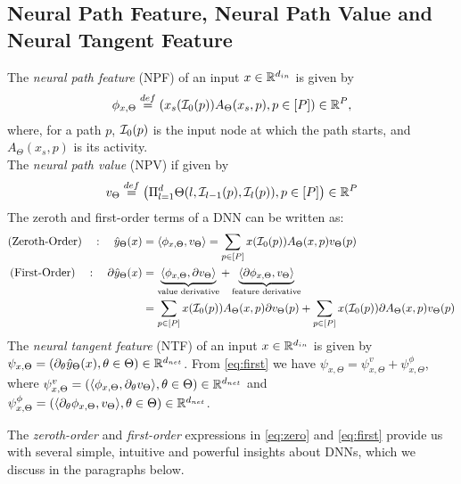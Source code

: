 \subsection{Neural Path Feature, Neural Path Value and Neural Tangent Feature}
The \emph{neural path feature} (NPF) of an input $x\in\mathbb{R}^{d_{in}}$ is given by 
\begin{align}\label{eq:npfdef}
\phi_{x,\Theta}\stackrel{def}=\left(x_s(\mathcal{I}_0(p))A_{\Theta}(x_s,p) ,p\in[P]\right)\in\mathbb{R}^P,
\end{align}
where, for a path $p$, $\mathcal{I}_0(p)$ is the input node at which the path starts, and $A_{\Theta}(x_s,p)$ is its activity. \\
The \emph{neural path value} (NPV) if given by  
\begin{align}\label{eq:npvdef}
v_{\Theta}\stackrel{def}=\left(\Pi_{l=1}^d \Theta(l,\mathcal{I}_{l-1}(p),\mathcal{I}_l(p)),p\in[P]\right)\in\mathbb{R}^P
\end{align}
The zeroth and first-order terms of a DNN can be written as:
\begin{align}
\label{eq:zero}\text{(Zeroth-Order)}\quad: \quad \hat{y}_{\Theta}(x)&=\langle \phi_{x,\Theta},v_{\Theta}\rangle=\sum_{p\in [P]}x(\mathcal{I}_0(p))A_{\Theta}(x,p)v_{\Theta}(p)\\
\label{eq:first}\text{(First-Order)}\quad: \quad \partial \hat{y}_{\Theta}(x)&=\underbrace{\langle \phi_{x,\Theta},\partial v_{\Theta}\rangle}_{\text{value derivative}}+ \underbrace{\langle \partial\phi_{x,\Theta},v_{\Theta}\rangle}_{\text{feature derivative}}\\&=\sum_{p\in [P]}x(\mathcal{I}_0(p)) A_{\Theta}(x,p) \partial v_{\Theta}(p)+\sum_{p\in [P]}x(\mathcal{I}_0(p)) \partial A_{\Theta}(x,p) v_{\Theta}(p)\nonumber
\end{align}
The \emph{neural tangent feature} (NTF) of an input $x\in\mathbb{R}^{d_{in}}$ is given by $\psi_{x,\Theta}=\left(\partial_{\theta}\hat{y}_{\Theta}(x),\theta\in\Theta\right)\in\mathbb{R}^{d_{net}}$. From \eqref{eq:first} we have $\psi_{x,\Theta}=\psi^v_{x,\Theta}+\psi^{\phi}_{x,\Theta}$, where $\psi^v_{x,\Theta}=\left(\langle \phi_{x,\Theta}, \partial_{\theta} v_{\Theta}\rangle,\theta\in\Theta\right)\in\mathbb{R}^{d_{net}}$ and  $\psi^{\phi}_{x,\Theta}=\left(\langle \partial_{\theta}\phi_{x,\Theta}, v_{\Theta}\rangle,\theta\in\Theta\right)\in\mathbb{R}^{d_{net}}$. 

The \emph{zeroth-order} and \emph{first-order} expressions in \eqref{eq:zero} and \eqref{eq:first} provide us with several simple, intuitive and powerful insights about DNNs, which we discuss in the paragraphs below.

